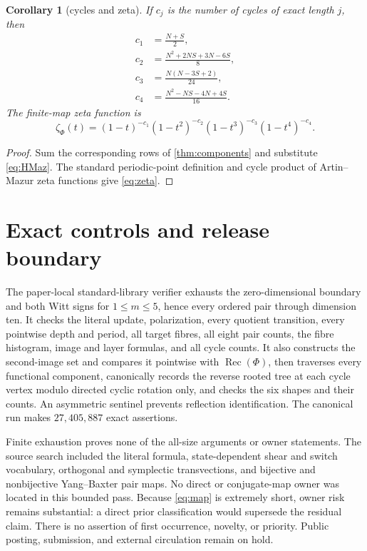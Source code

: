 \documentclass[10pt,a4paper]{amsart}
\newtheorem{corollary}[theorem]{Corollary}
\theoremstyle{definition}
\theoremstyle{remark}
\numberwithin{equation}{section}
\newcommand{\Rec}{\operatorname{Rec}}
\begin{document}
\begin{corollary}[cycles and zeta]\label{cor:zeta}
If \(c_j\) is the number of cycles of exact length \(j\), then
\begin{equation}
\begin{aligned}
 c_1&=\frac{N+S}{2},\\
 c_2&=\frac{N^2+2NS+3N-6S}{8},\\
 c_3&=\frac{N(N-3S+2)}{24},\\
 c_4&=\frac{N^2-NS-4N+4S}{16}.
\end{aligned}
\label{eq:cycles}
\end{equation}
The finite-map zeta function is
\begin{equation}
 \zeta_\Phi(t)=
 (1-t)^{-c_1}(1-t^2)^{-c_2}
 (1-t^3)^{-c_3}(1-t^4)^{-c_4}.                          \label{eq:zeta}
\end{equation}
\end{corollary}

\begin{proof}
Sum the corresponding rows of \cref{thm:components} and substitute
\eqref{eq:HMaz}.  The standard periodic-point definition and cycle product
of Artin--Mazur zeta functions \cite{ArtinMazur1965} give \eqref{eq:zeta}.
\end{proof}

\section{Exact controls and release boundary}

The paper-local standard-library verifier exhausts the zero-dimensional
boundary and both Witt signs for \(1\le m\le5\), hence every ordered pair
through dimension ten.  It checks the literal update, polarization, every
quotient transition, every pointwise depth and period, all target fibres,
all eight pair counts, the fibre histogram, image and layer formulas, and all
cycle counts.  It also constructs the second-image set and compares it
pointwise with \(\Rec(\Phi)\), then traverses every functional component,
canonically records the reverse rooted tree at each cycle vertex modulo
directed cyclic rotation only, and checks the six shapes and their counts.
An asymmetric sentinel prevents reflection identification.  The canonical
run makes \(27{,}405{,}887\) exact assertions.

Finite exhaustion proves none of the all-size arguments or owner statements.
The source search included the literal formula, state-dependent shear and
switch vocabulary, orthogonal and symplectic transvections, and bijective and
nonbijective Yang--Baxter pair maps.  No direct or conjugate-map owner was
located in this bounded pass.  Because \eqref{eq:map} is extremely short,
owner risk remains substantial: a direct prior classification would supersede
the residual claim.  There is no assertion of first occurrence, novelty, or
priority.  Public posting, submission, and external circulation remain on
hold.



\end{document}
